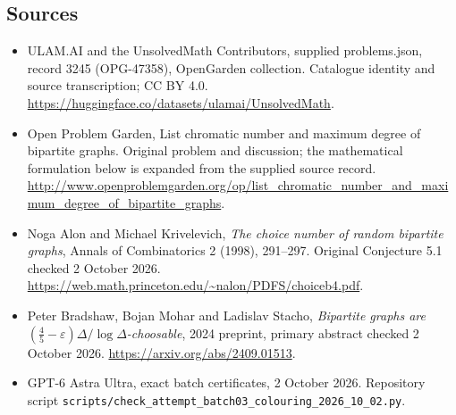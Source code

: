 \documentclass[11pt,a4paper]{article}
\begin{document}
\subsection{Sources}
\begin{itemize}
\item[S1] ULAM.AI and the UnsolvedMath Contributors, supplied problems.json, record 3245 (OPG-47358), OpenGarden collection. Catalogue identity and source transcription; CC BY 4.0.
\url{https://huggingface.co/datasets/ulamai/UnsolvedMath}.
\item[S2] Open Problem Garden, List chromatic number and maximum degree of bipartite graphs. Original problem and discussion; the mathematical formulation below is expanded from the supplied source record.
\url{http://www.openproblemgarden.org/op/list_chromatic_number_and_maximum_degree_of_bipartite_graphs}.

\item[R1] Noga Alon and Michael Krivelevich, \emph{The choice number
of random bipartite graphs}, Annals of Combinatorics 2 (1998), 291--297.
Original Conjecture 5.1 checked 2 October 2026.
\url{https://web.math.princeton.edu/~nalon/PDFS/choiceb4.pdf}.
\item[R2] Peter Bradshaw, Bojan Mohar and Ladislav Stacho,
\emph{Bipartite graphs are $(\frac45-\varepsilon)\Delta/\log\Delta$-choosable},
2024 preprint, primary abstract checked 2 October 2026.
\url{https://arxiv.org/abs/2409.01513}.
\item[R3] GPT-6 Astra Ultra, exact batch certificates, 2 October 2026.
Repository script \texttt{scripts/check\_attempt\_batch03\_colouring\_2026\_10\_02.py}.

\end{itemize}
\end{document}
